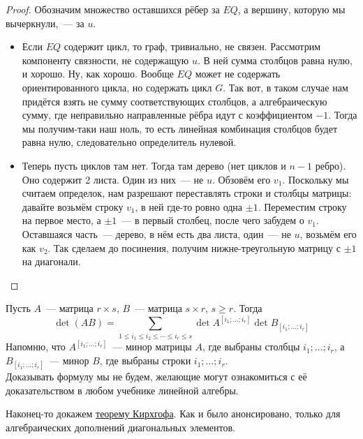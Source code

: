 \documentclass{article}
\begin{document}
    \begin{proof}
        Обозначим множество оставшихся рёбер за $EQ$, а вершину, которую мы вычеркнули,~--- за $u$.
        \begin{itemize}
            \item Если $EQ$ содержит цикл, то граф, тривиально, не связен. Рассмотрим компоненту связности, не содержащую $u$. В ней сумма столбцов равна нулю, и хорошо. Ну, как хорошо. Вообще $EQ$ может не содержать ориентированного цикла, но содержать цикл $G$. Так вот, в таком случае нам придётся взять не сумму соответствующих столбцов, а алгебраическую сумму, где неправильно направленные рёбра идут с коэффициентом $-1$. Тогда мы получим-таки наш ноль, то есть линейная комбинация столбцов будет равна нулю, следовательно определитель нулевой.
            \item Теперь пусть циклов там нет. Тогда там дерево (нет циклов и $n-1$ ребро). Оно содержит 2 листа. Один из них~--- не $u$. Обзовём его $v_1$. Поскольку мы считаем определок, нам разрешают переставлять строки и столбцы матрицы: давайте возьмём строку $v_1$, в ней где-то ровно одна $\pm1$. Переместим строку на первое место, а $\pm1$~--- в первый столбец, после чего забудем о $v_1$. Оставшаяся часть~--- дерево, в нём есть два листа, один~--- не $u$, возьмём его как $v_2$. Так сделаем до посинения, получим нижне-треугольную матрицу с $\pm1$ на диагонали.
        \end{itemize}
    \end{proof}
    \begin{claim}
        Пусть $A$~--- матрица $r\times s$, $B$~--- матрица $s\times r$, $s\geqslant r$. Тогда
        $$
        \det(AB) = \sum\limits_{1\leqslant i_1\leqslant i_2\leqslant\cdots\leqslant i_r\leqslant s}\det A^{[i_1;\ldots;i_r]}\det B_{[i_1;\ldots;i_r]}
        $$
        Напомню, что $A^{[i_1;\ldots;i_r]}$~--- минор матрицы $A$, где выбраны столбцы $i_1;\ldots;i_r$, а $B_{[i_1;\ldots;i_r]}$~--- минор $B$,  где выбраны строки $i_1;\ldots;i_r$.\\
        Доказывать формулу мы не будем, желающие могут ознакомиться с её доказательством в любом учебнике линейной алгебры.
    \end{claim}
    \begin{remark}
        Наконец-то докажем \hyperref[Теорема Кирхгофа]{теорему Кирхгофа}. Как и было анонсировано, только для алгебраических дополнений диагональных элементов.
    \end{remark}
\end{document}
